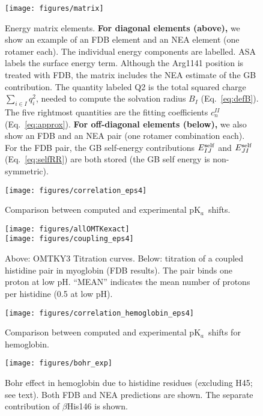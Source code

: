 \documentclass[a4paper,12pt]{article}
\newcommand{\pk}{pK$_a$}
\begin{document}
\begin{figure}[h]
\centering
\texttt{[image: figures/matrix]} 
\caption{Energy matrix elements. {\bf For diagonal elements (above),} we show an example of an FDB element and an NEA element
  (one rotamer each). The individual energy components are labelled. ASA labels the surface energy term. Although the Arg1141
  position is treated with FDB, the matrix includes the NEA estimate of the GB contribution. The quantity labeled Q2 is the total
  squared charge $\sum_{i \in I} q_i^2$, needed to compute the solvation radius $B_I$ (Eq.\ \ref{eq:defB}). The five rightmost
  quantities are the fitting coefficients $c^{II}_n$ (Eq.\ \ref{eq:approx}). {\bf For off-diagonal elements (below),} we also
  show an FDB and an NEA pair (one rotamer combination each). For the FDB pair, the GB self-energy contributions $E_{IJ}^{\rm self}$
  and $E_{JI}^{\rm self}$ (Eq.\ \ref{eq:selfRR}) are both stored (the GB self energy is non-symmetric).} \label{fig:matrix}  
\end{figure}


\begin{figure}[h]
\centering
\texttt{[image: figures/correlation\_eps4]} 
\caption{Comparison between computed and experimental \pk\ shifts.} \label{fig:correl}  
\end{figure}


\begin{figure}[h]
\centering
\texttt{[image: figures/allOMTKexact]} \\
\texttt{[image: figures/coupling\_eps4]}
\caption{Above: OMTKY3 Titration curves. Below: titration of a coupled histidine pair in myoglobin (FDB results). The
pair binds one proton at low pH. ``MEAN'' indicates the mean number of protons per histidine (0.5 at low pH).} \label{fig:titrate}  
\end{figure}


\begin{figure}[h]
\centering
\texttt{[image: figures/correlation\_hemoglobin\_eps4]} 
\caption{Comparison between computed and experimental \pk\ shifts for hemoglobin.} \label{fig:hbcorrel}  
\end{figure}


\begin{figure}[h]
\centering
\texttt{[image: figures/bohr\_exp]} \\
\caption{Bohr effect in hemoglobin due to histidine residues (excluding H45; see text). Both FDB and NEA predictions
  are shown. The separate contribution of $\beta$His146 is shown. } \label{fig:bohr}  
\end{figure}
\end{document}
